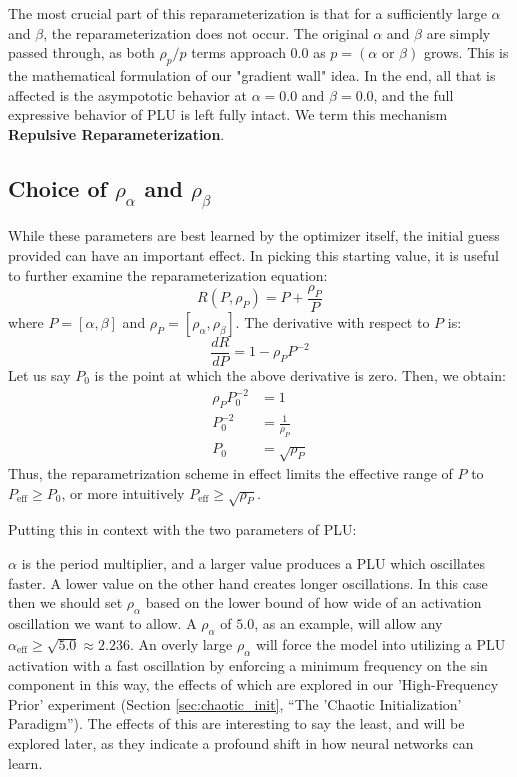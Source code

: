 \documentclass[11pt, letterpaper]{article}
\begin{document}
The most crucial part of this reparameterization is that for a sufficiently large $\alpha$ and $\beta$, the reparameterization does not occur. The original $\alpha$ and $\beta$ are simply passed through, as both $\rho_p / p$ terms approach $0.0$ as $p=(\alpha \text{ or } \beta)$ grows. This is the mathematical formulation of our "gradient wall" idea. In the end, all that is affected is the asympototic behavior at $\alpha=0.0$ and $\beta=0.0$, and the full expressive behavior of PLU is left fully intact. We term this mechanism \textbf{Repulsive Reparameterization}.

\subsection{Choice of \texorpdfstring{$\rho_\alpha$ and $\rho_\beta$}{rho\_alpha and rho\_beta}}

While these parameters are best learned by the optimizer itself, the initial guess provided can have an important effect. In picking this starting value, it is useful to further examine the reparameterization equation:
\begin{equation}
    R(P, \rho_P) = P + \frac{\rho_P}{P}
    \label{eq:reparam}
\end{equation}
where $P = [\alpha, \beta]$ and $\rho_P = [\rho_\alpha, \rho_\beta]$.
The derivative with respect to $P$ is:
\begin{equation}
    \frac{dR}{dP} = 1 - \rho_P P^{-2}
\end{equation}
Let us say $P_0$ is the point at which the above derivative is zero. Then, we obtain:
\begin{align*}
    \rho_P P_0^{-2} &= 1 \\
    P_0^{-2} &= \frac{1}{\rho_P} \\
    P_0 &= \sqrt{\rho_P}
\end{align*}
Thus, the reparametrization scheme in effect limits the effective range of $P$ to $P_{\text{eff}} \ge P_0$, or more intuitively $P_{\text{eff}} \ge \sqrt{\rho_P}$.

Putting this in context with the two parameters of PLU:

$\alpha$ is the period multiplier, and a larger value produces a PLU which oscillates faster. A lower value on the other hand creates longer oscillations. In this case then we should set $\rho_\alpha$ based on the lower bound of how wide of an activation oscillation we want to allow. A $\rho_\alpha$ of $5.0$, as an example, will allow any $\alpha_{\text{eff}} \ge \sqrt{5.0} \approx 2.236$. An overly large $\rho_\alpha$ will force the model into utilizing a PLU activation with a fast oscillation by enforcing a minimum frequency on the sin component in this way, the effects of which are explored in our 'High-Frequency Prior' experiment (Section \ref{sec:chaotic_init}, ``The 'Chaotic Initialization' Paradigm''). The effects of this are interesting to say the least, and will be explored later, as they indicate a profound shift in how neural networks can learn.
\end{document}
